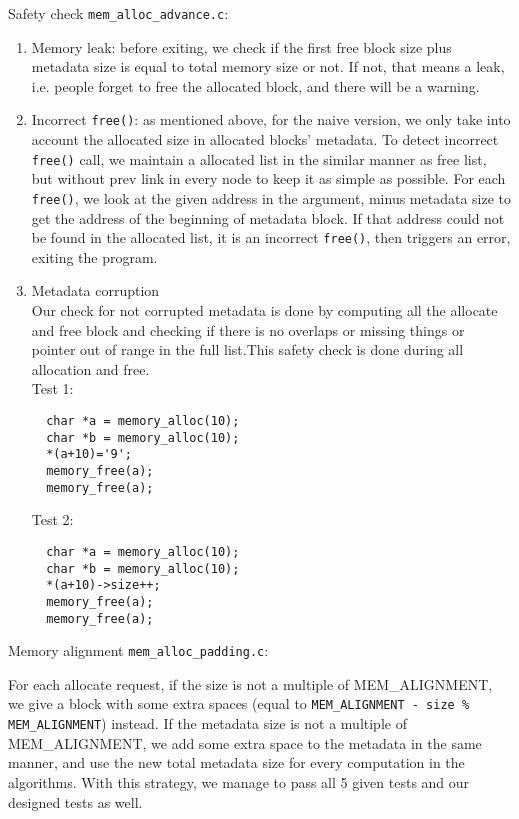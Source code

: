 \documentclass{article}
\begin{document}
\begin{flushleft}
Safety check \texttt{mem\_alloc\_advance.c}:

\begin{enumerate}
\item Memory leak: before exiting, we check if the first free block size plus metadata size is equal to total memory size or not. If not, that means a leak, i.e. people forget to free the allocated block, and there will be a warning.

\item Incorrect \texttt{free()}: as mentioned above, for the naive version, we only take into account the allocated size in allocated blocks' metadata. To detect incorrect \texttt{free()} call, we maintain a allocated list in the similar manner as free list, but without prev link in every node to keep it as simple as possible. For each \texttt{free()}, we look at the given address in the argument, minus metadata size to get the address of the beginning of metadata block. If that address could not be found in the allocated list, it is an incorrect \texttt{free()}, then triggers an error, exiting the program.

\item Metadata corruption\\
Our check for not corrupted metadata is done by computing all the allocate and free block and checking if there is no overlaps or missing things or pointer out of range in the full list.This safety check is done during all allocation and free.\\
Test 1:\\
\begin{lstlisting}
  char *a = memory_alloc(10);
  char *b = memory_alloc(10);
  *(a+10)='9';
  memory_free(a);
  memory_free(a);
\end{lstlisting}
Test 2:\\
\begin{lstlisting}
  char *a = memory_alloc(10);
  char *b = memory_alloc(10);
  *(a+10)->size++;
  memory_free(a);
  memory_free(a);
\end{lstlisting}

\end{enumerate}


\end{flushleft}

\begin{flushleft}
Memory alignment \texttt{mem\_alloc\_padding.c}:


For each allocate request, if the size is not a multiple of MEM\_ALIGNMENT, we give a block with some extra spaces (equal to \texttt{MEM\_ALIGNMENT - size \% MEM\_ALIGNMENT}) instead. If the metadata size is not a multiple of MEM\_ALIGNMENT, we add some extra space to the metadata in the same manner, and use the new total metadata size for every computation in the algorithms. With this strategy, we manage to pass all 5 given tests and our designed tests as well.


\end{flushleft}
\end{document}
